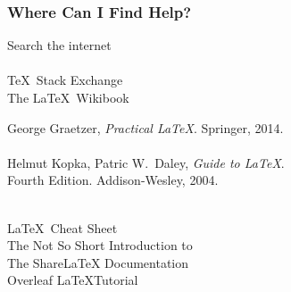 
\begin{frame}
\frametitle{Where Can I Find Help?}

\begin{description}
\setlength{}
\setlength\itemindent{1em}
\item[Online]
Search the internet \\
\hspace{\itemindent}%
 \\
\hspace{\itemindent}\TeX\ Stack Exchange 
 \\
\hspace{\itemindent}The \LaTeX\ Wikibook 
\medskip
\pause

\item[Books]
George Graetzer, \emph{Practical \LaTeX}. Springer, 2014. \\
\hspace{\itemindent} \\
\hspace{\itemindent}%
Helmut Kopka, Patric W.~Daley, \emph{Guide to \LaTeX}. \\
\hspace{\itemindent}Fourth Edition. Addison-Wesley, 2004. \\
\hspace{\itemindent} \\
\medskip
\pause

\item[Other]
\LaTeX\ Cheat Sheet 
\href{https://wch.github.io/latexsheet/}{%
{ }} \\
\hspace{\itemindent}The Not So Short Introduction to \LaTeXe
\href{http://tug.ctan.org/info/lshort/english/lshort.pdf}{%
{ }} \\
\hspace{\itemindent}The ShareLaTeX Documentation
\href{https://www.sharelatex.com/learn}{%
{ }} \\
\hspace{\itemindent}Overleaf \LaTeX Tutorial
\href{https://www.overleaf.com/latex/learn/free-online-introduction-to-latex-part-1}{%
{ }}
\end{description}
\end{frame}

